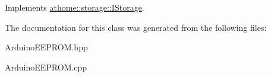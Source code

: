 Implements \mbox{\hyperlink{classathome_1_1storage_1_1_i_storage_a1017bb6ad438313b98197893954e52f1}{athome\+::storage\+::\+I\+Storage}}.



The documentation for this class was generated from the following files\+:\begin{DoxyCompactItemize}
\item 
Arduino\+E\+E\+P\+R\+O\+M.\+hpp\item 
Arduino\+E\+E\+P\+R\+O\+M.\+cpp\end{DoxyCompactItemize}
